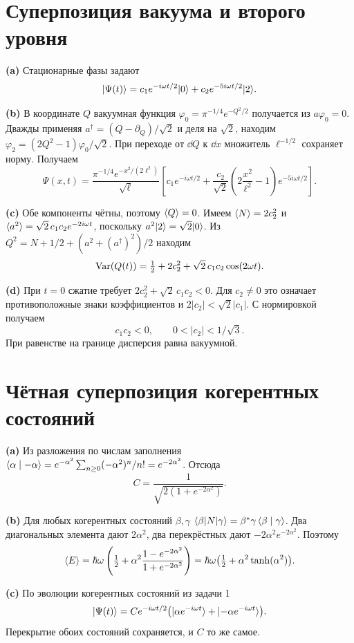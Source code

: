\documentclass[11pt,a4paper]{article}
\begin{document}
\section{Суперпозиция вакуума и второго уровня}

\textbf{(a)} Стационарные фазы задают
\[
 \lvert \Psi(t)\rangle=c_1e^{-i\omega t/2}\lvert 0\rangle+c_2e^{-5i\omega t/2}\lvert 2\rangle .
\]

\textbf{(b)} В координате \(Q\) вакуумная функция
\(\varphi_0=\pi^{-1/4}e^{-Q^2/2}\) получается из \(a\varphi_0=0\).
Дважды применяя \(a^\dagger=(Q-\partial_Q)/\sqrt2\) и деля на
\(\sqrt2\), находим \(\varphi_2=(2Q^2-1)\varphi_0/\sqrt2\).
При переходе от \(\dd Q\) к \(\dd x\) множитель \(\ell^{-1/2}\)
сохраняет норму. Получаем
\[
 \Psi(x,t)=\frac{\pi^{-1/4}e^{-x^2/(2\ell^2)}}{\sqrt\ell}
     \left[c_1 e^{-i\omega t/2}
          +\frac{c_2}{\sqrt2}\left(2\frac{x^2}{\ell^2}-1\right)
                            e^{-5i\omega t/2}\right].
\]

\textbf{(c)} Обе компоненты чётны, поэтому \(\langle Q\rangle=0\).
Имеем \(\langle N\rangle=2c_2^2\) и
\(\langle a^2\rangle=\sqrt2\,c_1c_2 e^{-2i\omega t}\),
поскольку \(a^2\lvert 2\rangle=\sqrt2\lvert 0\rangle\).
Из \(Q^2=N+1/2+(a^2+(a^\dagger)^2)/2\) находим
\[
 \operatorname{Var}(Q(t))=\tfrac12+2c_2^2+\sqrt2\,c_1c_2\cos(2\omega t).
\]

\textbf{(d)} При \(t=0\) сжатие требует
\(2c_2^2+\sqrt2\,c_1c_2<0\).
Для \(c_2\ne0\) это означает противоположные знаки коэффициентов
и \(2|c_2|<\sqrt2|c_1|\). С нормировкой получаем
\[
 c_1c_2<0,\qquad 0<|c_2|<1/\sqrt3 .
\]
При равенстве на границе дисперсия равна вакуумной.

\section{Чётная суперпозиция когерентных состояний}

\textbf{(a)} Из разложения по числам заполнения
\(\langle \alpha\mid -\alpha\rangle=e^{-\alpha^2}\sum_{n\ge0}(-\alpha^2)^n/n!
=e^{-2\alpha^2}\). Отсюда
\[
 C=\frac{1}{\sqrt{2(1+e^{-2\alpha^2})}}.
\]

\textbf{(b)} Для любых когерентных состояний \(\beta,\gamma\)
\(\langle \beta\rvert N\lvert \gamma\rangle=\beta^*\gamma\,\langle \beta\mid \gamma\rangle\).
Два диагональных элемента дают \(2\alpha^2\), два перекрёстных
дают \(-2\alpha^2e^{-2\alpha^2}\). Поэтому
\[
 \langle E\rangle=\hbar\omega\left(\tfrac12+
       \alpha^2\frac{1-e^{-2\alpha^2}}{1+e^{-2\alpha^2}}\right)
          =\hbar\omega\bigl(\tfrac12+\alpha^2\tanh(\alpha^2)\bigr).
\]

\textbf{(c)} По эволюции когерентных состояний из задачи 1
\[
 \lvert \Psi(t)\rangle=C e^{-i\omega t/2}
    \bigl(\lvert \alpha e^{-i\omega t}\rangle+\lvert -\alpha e^{-i\omega t}\rangle\bigr).
\]
Перекрытие обоих состояний сохраняется, и \(C\) то же самое.
\end{document}
